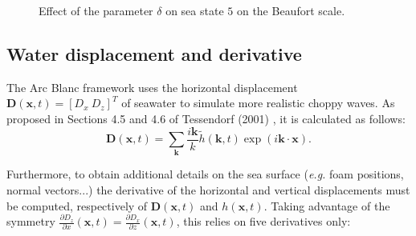 \documentclass[final]{jcgt}
\def\Framework{The Arc Blanc framework\xspace}
\begin{document}
\begin{figure}[htbp]
	\centering

	\hfill
	\caption{Effect of the parameter $\delta$ on sea state $5$ on the Beaufort scale.}
	\label{fig:dispersionEffect}
\end{figure}

\subsection{Water displacement and derivative}

\Framework uses the horizontal displacement $\mathbf{D}(\mathbf x,t) = \left[D_x\ D_z\right]^T$ of seawater to simulate more realistic choppy waves.
As proposed in Sections 4.5 and 4.6 of Tessendorf (2001) \cite{tessendorfSimulating2001}, it is calculated as follows:
\begin{equation}\label{equa:hori-displacement}
	\mathbf{D}(\mathbf x,t) = \sum_{\mathbf{k}} \frac{i\mathbf{k}}{k} \tilde{h}(\mathbf{k}, t)\exp\left(i\mathbf{k}\cdot\mathbf x\right).
\end{equation}

Furthermore, to obtain additional details on the sea surface (\emph{e.g.} foam positions, normal vectors...) the derivative of the horizontal and vertical displacements must be computed, respectively of $\mathbf{D}(\mathbf x,t)$ and $h(\mathbf x,t)$.
Taking advantage of the symmetry $\frac{\partial D_z}{\partial x}(\mathbf x,t) = \frac{\partial D_x}{\partial z}(\mathbf x,t)$, this relies on five derivatives only:
\end{document}
